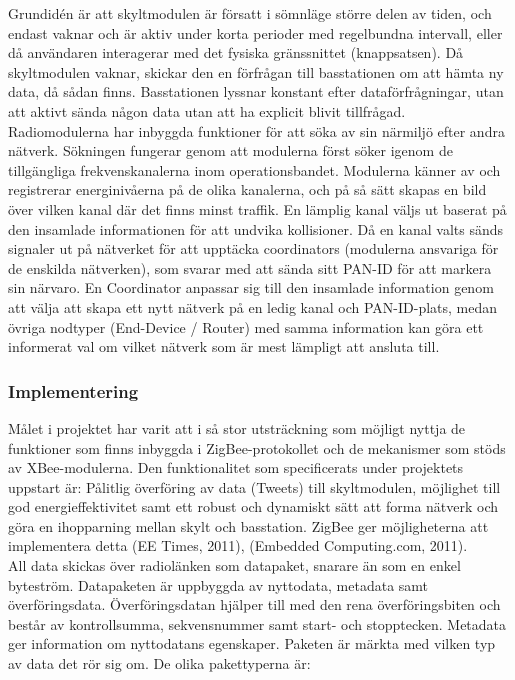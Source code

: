 \documentclass[a4paper,11pt]{article}
\begin{document}
Grundidén är att skyltmodulen är försatt i sömnläge större delen av tiden, och endast vaknar och är aktiv under korta perioder med regelbundna intervall, eller då användaren interagerar med det fysiska gränssnittet (knappsatsen). Då skyltmodulen vaknar, skickar den en förfrågan till basstationen om att hämta ny data, då sådan finns. Basstationen lyssnar konstant efter dataförfrågningar, utan att aktivt sända någon data utan att ha explicit blivit tillfrågad. \\

Radiomodulerna har inbyggda funktioner för att söka av sin närmiljö efter andra nätverk. Sökningen fungerar genom att modulerna först söker igenom de tillgängliga frekvenskanalerna inom operationsbandet. Modulerna känner av och registrerar energinivåerna på de olika kanalerna, och på så sätt skapas en bild över vilken kanal där det finns minst traffik. En lämplig kanal väljs ut baserat på den insamlade informationen för att undvika kollisioner. Då en kanal valts sänds signaler ut på nätverket för att upptäcka coordinators (modulerna ansvariga för de enskilda nätverken), som svarar med att sända sitt PAN-ID för att markera sin närvaro. En Coordinator anpassar sig till den insamlade information genom att välja att skapa ett nytt nätverk på en ledig kanal och PAN-ID-plats, medan övriga nodtyper (End-Device / Router) med samma information kan göra ett informerat val om vilket nätverk som är mest lämpligt att ansluta till.

\subsubsection{Implementering}
Målet i projektet har varit att i så stor utsträckning som möjligt nyttja de funktioner som finns inbyggda i ZigBee-protokollet och de mekanismer som stöds av XBee-modulerna.
Den funktionalitet som specificerats under projektets uppstart är: Pålitlig överföring av data (Tweets) till skyltmodulen, möjlighet till god energieffektivitet samt ett robust och dynamiskt sätt att forma nätverk och göra en ihopparning mellan skylt och basstation. ZigBee ger möjligheterna att implementera detta (EE Times, 2011),  (Embedded Computing.com, 2011). \\

All data skickas över radiolänken som datapaket, snarare än som en enkel byteström. Datapaketen är uppbyggda av nyttodata, metadata samt överföringsdata. Överföringsdatan hjälper till med den rena överföringsbiten och består av kontrollsumma, sekvensnummer samt start- och stopptecken. Metadata ger information om nyttodatans egenskaper.
Paketen är märkta med vilken typ av data det rör sig om. De olika pakettyperna är:
\end{document}
